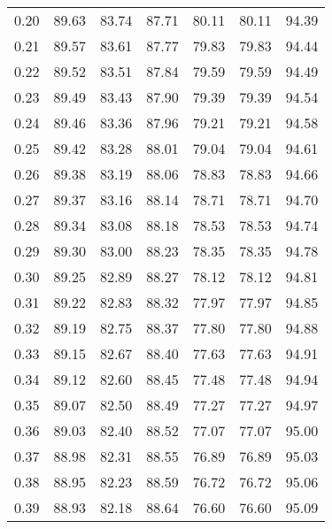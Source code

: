 \begin{tabular}{|c|c|c|c|c|c|c|}
      0.20 &     89.63 &     83.74 &      87.71 &   80.11 &      80.11 &         94.39 \\
      0.21 &     89.57 &     83.61 &      87.77 &   79.83 &      79.83 &         94.44 \\
      0.22 &     89.52 &     83.51 &      87.84 &   79.59 &      79.59 &         94.49 \\
      0.23 &     89.49 &     83.43 &      87.90 &   79.39 &      79.39 &         94.54 \\
      0.24 &     89.46 &     83.36 &      87.96 &   79.21 &      79.21 &         94.58 \\
      0.25 &     89.42 &     83.28 &      88.01 &   79.04 &      79.04 &         94.61 \\
      0.26 &     89.38 &     83.19 &      88.06 &   78.83 &      78.83 &         94.66 \\
      0.27 &     89.37 &     83.16 &      88.14 &   78.71 &      78.71 &         94.70 \\
      0.28 &     89.34 &     83.08 &      88.18 &   78.53 &      78.53 &         94.74 \\
      0.29 &     89.30 &     83.00 &      88.23 &   78.35 &      78.35 &         94.78 \\
      0.30 &     89.25 &     82.89 &      88.27 &   78.12 &      78.12 &         94.81 \\
      0.31 &     89.22 &     82.83 &      88.32 &   77.97 &      77.97 &         94.85 \\
      0.32 &     89.19 &     82.75 &      88.37 &   77.80 &      77.80 &         94.88 \\
      0.33 &     89.15 &     82.67 &      88.40 &   77.63 &      77.63 &         94.91 \\
      0.34 &     89.12 &     82.60 &      88.45 &   77.48 &      77.48 &         94.94 \\
      0.35 &     89.07 &     82.50 &      88.49 &   77.27 &      77.27 &         94.97 \\
      0.36 &     89.03 &     82.40 &      88.52 &   77.07 &      77.07 &         95.00 \\
      0.37 &     88.98 &     82.31 &      88.55 &   76.89 &      76.89 &         95.03 \\
      0.38 &     88.95 &     82.23 &      88.59 &   76.72 &      76.72 &         95.06 \\
      0.39 &     88.93 &     82.18 &      88.64 &   76.60 &      76.60 &         95.09 \\

\end{tabular}
